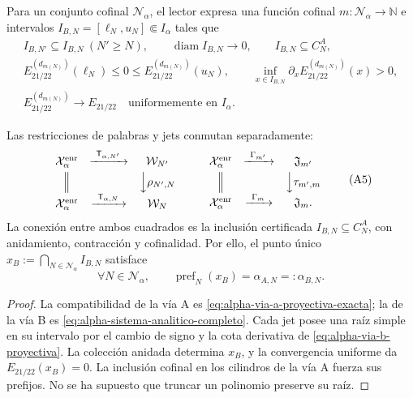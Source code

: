 Para un conjunto cofinal \(\mathcal N_\alpha\), el lector expresa una función
cofinal \(m:\mathcal N_\alpha\to\mathbb N\) e intervalos
\(I_{B,N}=[\ell_N,u_N]\Subset I_\alpha\) tales que
\begin{equation}
\begin{gathered}
 I_{B,N'}\subseteq I_{B,N}\ (N'\ge N),\qquad
 \operatorname{diam}I_{B,N}\longrightarrow0,\qquad
 I_{B,N}\subseteq C_N^A,\\
 E_{21/22}^{(d_{m(N)})}(\ell_N)\le0\le
 E_{21/22}^{(d_{m(N)})}(u_N),\qquad
 \inf_{x\in I_{B,N}}\partial_xE_{21/22}^{(d_{m(N)})}(x)>0,\\
 E_{21/22}^{(d_{m(N)})}\longrightarrow E_{21/22}
 \quad\text{uniformemente en }I_\alpha .
\end{gathered}
 \tag{A4}
 \label{eq:alpha-via-b-proyectiva}
\end{equation}

\begin{proposition}
\label{prop:alpha-cuadrados-compatibilidad}
Las restricciones de palabras y jets conmutan separadamente:
\[
\begin{array}{ccc}
 \mathcal X_\alpha^{\mathrm{enr}}&
 \xrightarrow{\ \mathsf T_{\alpha,N'}\ }&\mathcal W_{N'}\\[1mm]
 \Big\Vert&&\Big\downarrow\rho_{N',N}\\[1mm]
 \mathcal X_\alpha^{\mathrm{enr}}&
 \xrightarrow{\ \mathsf T_{\alpha,N}\ }&\mathcal W_N
\end{array}
\qquad
\begin{array}{ccc}
 \mathcal X_\alpha^{\mathrm{enr}}&
 \xrightarrow{\ \Gamma_{m'}\ }&\mathfrak J_{m'}\\[1mm]
 \Big\Vert&&\Big\downarrow\tau_{m',m}\\[1mm]
 \mathcal X_\alpha^{\mathrm{enr}}&
 \xrightarrow{\ \Gamma_m\ }&\mathfrak J_m .
\end{array}
 \tag{A5}
\]
La conexión entre ambos cuadrados es la inclusión certificada
\(I_{B,N}\subseteq C_N^A\), con anidamiento, contracción y cofinalidad. Por
ello, el punto único
\(x_B:=\bigcap_{N\in\mathcal N_\alpha}I_{B,N}\) satisface
\begin{equation}
 \forall N\in\mathcal N_\alpha,\qquad
 \operatorname{pref}_N(x_B)=\alpha_{A,N}=:\alpha_{B,N}.
 \tag{A6}
 \label{eq:alpha-igualdad-cada-nivel}
\end{equation}
\end{proposition}

\begin{proof}
La compatibilidad de la vía A es
\eqref{eq:alpha-via-a-proyectiva-exacta}; la de la vía B es
\eqref{eq:alpha-sistema-analitico-completo}. Cada jet posee una raíz simple
en su intervalo por el cambio de signo y la cota derivativa de
\eqref{eq:alpha-via-b-proyectiva}. La colección anidada determina \(x_B\), y la
convergencia uniforme da \(E_{21/22}(x_B)=0\). La inclusión cofinal en los
cilindros de la vía A fuerza sus prefijos. No se ha supuesto que truncar un
polinomio preserve su raíz.
\end{proof}

